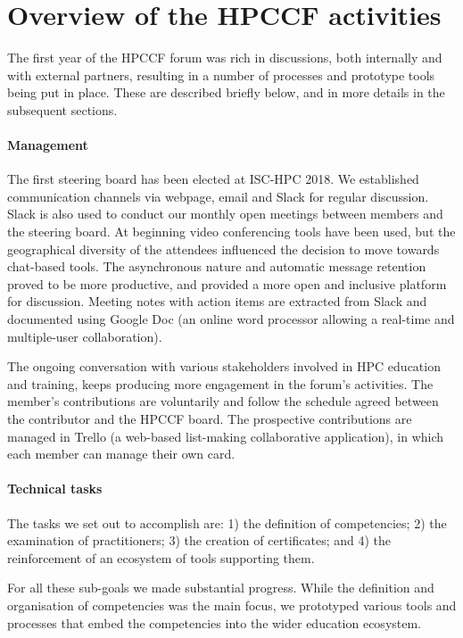 \documentclass[jocse]{jocseart}
\begin{document}
\section{Overview of the HPCCF activities}
\label{sec:status}

The first year of the HPCCF forum was rich in discussions, both internally and with external partners, resulting in a number of processes and prototype tools being put in place. These are described briefly below, and in more details in the subsequent sections.

\paragraph{Management}
The first steering board has been elected at ISC-HPC 2018.
We established communication channels via webpage, email and Slack for regular discussion.
Slack is also used to conduct our monthly open meetings between members and the steering board.
At beginning video conferencing tools have been used, but the geographical diversity of the attendees influenced the decision to move towards chat-based tools. 
The asynchronous nature and automatic message retention proved to be more productive, and provided a more open and inclusive platform for discussion.    
Meeting notes with action items are extracted from Slack and documented using Google Doc (an online word processor allowing a real-time and multiple-user collaboration).  

The ongoing conversation with various stakeholders involved in HPC education and training, keeps producing more engagement in the forum's activities.   
The member's contributions are voluntarily and follow the schedule agreed between the contributor and the HPCCF board.
The prospective contributions are managed in Trello (a web-based list-making collaborative application), in which each member can manage their own card.

\paragraph{Technical tasks}
The tasks we set out to accomplish are:  1) the definition of competencies; 2) the examination of practitioners;  3) the creation of certificates; and 4) the reinforcement of an ecosystem of tools supporting them.

For all these sub-goals we made substantial progress.
While the definition and organisation of competencies was the main focus, we prototyped various tools and processes that embed the competencies into the wider education ecosystem.
\end{document}
